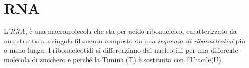 \section{RNA}
L'\textit{RNA}, è una macromolecola che sta per acido ribonucleico, caratterizzato da una struttura a singolo filamento composto da una \textit{sequenza di ribonucleotidi} più o meno lunga.
\newline
I ribonucleotidi si differenziano dai nucleotidi per una differente molecola di zucchero e perché la Timina (T) è sostituita con l'Uracile(U).
